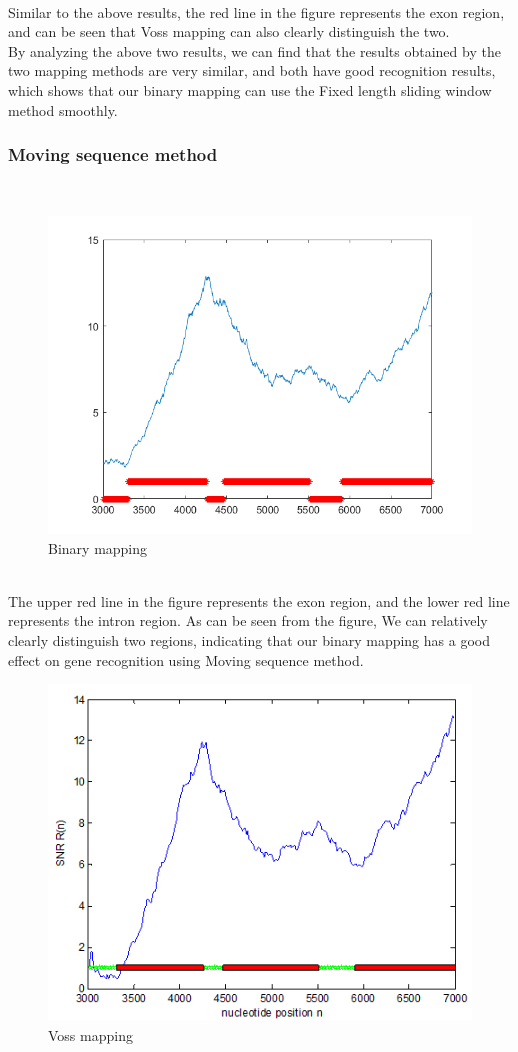 \documentclass[conference]{IEEEtran}
\begin{document}
~\\\indent Similar to the above results, the red line in the figure represents the exon region, and can be seen that Voss mapping can also clearly distinguish the two.
~\\\indent By analyzing the above two results, we can find that the results obtained by the two mapping methods are very similar, and both have good recognition results, which shows that our binary mapping can use the Fixed length sliding window method smoothly.
\subsubsection{Moving sequence method}
~\\
\begin{figure}[H]
    \centering
    \includegraphics[width=\linewidth]{moveb.png}
    \caption{Binary mapping}
    \label{moveb}
\end{figure}
~\\\indent The upper red line in the figure represents the exon region, and the lower red line represents the intron region. As can be seen from the figure, We can relatively clearly distinguish two regions, indicating that our binary mapping has a good effect on gene recognition using Moving sequence method.
\begin{figure}[H]
    \centering
    \includegraphics[width=0.9\linewidth]{movev.png}
    \caption{Voss mapping}
    \label{movev}
\end{figure}
\end{document}
